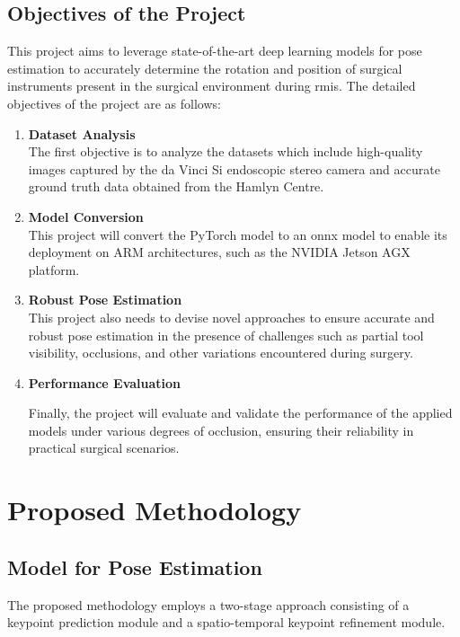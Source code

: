 \documentclass[12pt]{article}
\begin{document}
\subsection{Objectives of the Project}
This project aims to leverage state-of-the-art deep learning models for pose estimation to accurately determine the rotation and position of surgical instruments present in the surgical environment during \gls{rmis}. The detailed objectives of the project are as follows:

\begin{enumerate}

\item \textbf{Dataset Analysis}
\\The first objective is to analyze the datasets which include high-quality images captured by the da Vinci Si endoscopic stereo camera and accurate ground truth data obtained from the Hamlyn Centre.

\item \textbf{Model Conversion}
\\This project will convert the PyTorch model to an \gls{onnx} model to enable its deployment on ARM architectures, such as the NVIDIA Jetson AGX platform.



\item \textbf{Robust Pose Estimation}
\\This project also needs to devise novel approaches to ensure accurate and robust pose estimation in the presence of challenges such as partial tool visibility, occlusions, and other variations encountered during surgery. 

\item \textbf{Performance Evaluation}

Finally, the project will evaluate and validate the performance of the applied models under various degrees of occlusion, ensuring their reliability in practical surgical scenarios.

\end{enumerate}



\section{Proposed Methodology}
\subsection{Model for Pose Estimation}
The proposed methodology employs a two-stage approach consisting of a keypoint prediction module and a spatio-temporal keypoint refinement module\cite{xu2023graph}.
\end{document}
